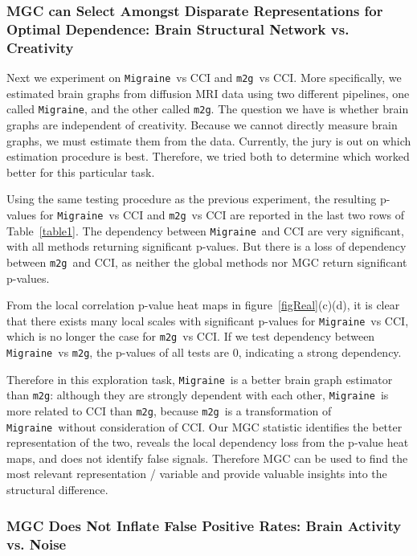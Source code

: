 \documentclass[11pt]{article}
\providecommand{\sct}[1]{{\sc \texttt{#1}}}
\newcommand{\Migraine}{\sct{Migraine}}
\newcommand{\mtg}{\sct{m2g}}
\begin{document}
\subsubsection{MGC can Select Amongst Disparate Representations for Optimal Dependence: Brain Structural Network vs. Creativity}

Next we experiment on \Migraine~vs CCI and \mtg~vs CCI. More specifically, we estimated brain graphs from diffusion MRI data using two different pipelines, one called \Migraine, and the other called \mtg.  The question we have is whether brain graphs are independent of creativity.  Because we cannot directly measure brain graphs, we must estimate them from the data.  Currently, the jury is out on which estimation procedure is best.  Therefore, we tried both to determine which worked better for this particular task.

Using the same testing procedure as the previous experiment, the resulting p-values for \Migraine~vs CCI and \mtg~vs CCI are reported in the last two rows of Table~\ref{table1}. The dependency between \Migraine~and CCI are very significant, with all methods returning significant p-values. But there is a loss of dependency between \mtg~and CCI, as neither the global methods nor MGC return significant p-values. 

From the local correlation p-value heat maps in figure~\ref{figReal}(c)(d), it is clear that there exists many local scales with significant p-values for \Migraine~vs CCI, which is no longer the case for \mtg~vs CCI. If we test dependency between \Migraine~vs \mtg, the p-values of all tests are $0$, indicating a strong dependency. 

Therefore in this exploration task, \Migraine~is a better brain graph estimator than \mtg: although they are strongly dependent with each other, \Migraine~is more related to CCI than \mtg, because \mtg~is a transformation of \Migraine~without consideration of CCI. Our MGC statistic identifies the better representation of the two, reveals the local dependency loss from the p-value heat maps, and does not identify false signals. Therefore MGC can be used to find the most relevant representation / variable and provide valuable insights into the structural difference.

\subsubsection{MGC Does Not Inflate False Positive Rates: Brain Activity vs. Noise}
\end{document}
